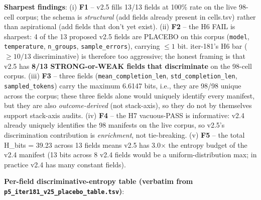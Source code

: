 \noindent\textbf{Sharpest findings}: (i) \textbf{F1} -- v2.5 fills 13/13 fields
at 100\% rate on the live 98-cell corpus; the schema is \emph{structural}
(add fields already present in cells.tsv) rather than aspirational
(add fields that don't yet exist). (ii) \textbf{F2} -- the H6 FAIL is
sharpest: 4 of the 13 proposed v2.5 fields are PLACEBO on this corpus
(\texttt{model}, \texttt{temperature}, \texttt{n\_groups},
\texttt{sample\_errors}), carrying $\leq 1$ bit. iter-181's H6 bar
($\geq 10/13$ discriminative) is therefore too aggressive; the honest
framing is that v2.5 has \textbf{8/13 STRONG-or-WEAK fields that
discriminate} on the 98-cell corpus. (iii) \textbf{F3} -- three fields
(\texttt{mean\_completion\_len}, \texttt{std\_completion\_len},
\texttt{sampled\_tokens}) carry the maximum 6.6147 bits, i.e., they
are 98/98 unique across the corpus; these three fields alone would
uniquely identify every manifest, but they are also \emph{outcome-derived}
(not stack-axis), so they do not by themselves support stack-axis audits.
(iv) \textbf{F4} -- the H7 vacuous-PASS is informative: v2.4 already
uniquely identifies the 98 manifests on the live corpus, so v2.5's
discrimination contribution is \emph{enrichment}, not tie-breaking.
(v) \textbf{F5} -- the total H\_bits = 39.23 across 13 fields means
v2.5 has 3.0$\times$ the entropy budget of the v2.4 manifest
(13 bits across 8 v2.4 fields would be a uniform-distribution max;
in practice v2.4 has many constant fields).

\noindent\textbf{Per-field discriminative-entropy table (verbatim from
\texttt{p5\_iter181\_v25\_placebo\_table.tsv})}:

